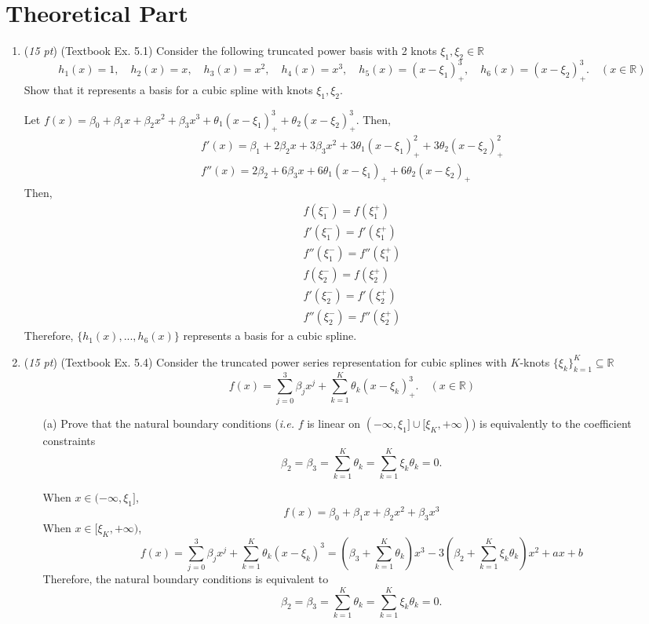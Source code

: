 \documentclass[10pt]{article}
\theoremstyle{definition}
\theoremstyle{remark}
\newcommand{\bbR}{\mathbb{R}}
\begin{document}
\section*{Theoretical Part}
\begin{enumerate}
	\item (\textit{15 pt}) (Textbook Ex. 5.1) Consider the following truncated power basis with 2 knots $ \xi_{1},\xi_{2} \in \bbR $
	\[ h_{1}(x) = 1, \quad h_{2}(x) = x, \quad h_{3}(x) = x^{2}, \quad h_{4}(x) = x^{3}, \quad h_{5}(x) = (x - \xi_{1})_{+}^{3}, \quad h_{6}(x) = (x - \xi_{2})_{+}^{3}. \quad(x \in \bbR) \]
	Show that it represents a basis for a cubic spline with knots $\xi_{1},\xi_{2}$. 
	
	Let $f(x) = \beta_0 + \beta_1 x + \beta_2 x^2 + \beta_3 x^3 + \theta_1 (x-\xi_1)_+^3 + \theta_2 (x-\xi_2)_+^3$. Then,
	\begin{gather*}
	    f'(x) = \beta_1 + 2\beta_2 x + 3\beta_3 x^2 + 3\theta_1 (x-\xi_1)_+^2 + 3\theta_2 (x-\xi_2)_+^2 \\
	    f''(x) = 2\beta_2 + 6\beta_3 x + 6\theta_1 (x-\xi_1)_+ + 6\theta_2 (x-\xi_2)_+
	\end{gather*}
	Then,
	\begin{gather*}
	    f(\xi_1^-) = f(\xi_1^+)  \\
	    f'(\xi_1^-) = f'(\xi_1^+)  \\
	    f''(\xi_1^-) = f''(\xi_1^+)  \\
	    f(\xi_2^-) = f(\xi_2^+)  \\
	    f'(\xi_2^-) = f'(\xi_2^+)  \\
	    f''(\xi_2^-) = f''(\xi_2^+) 
	\end{gather*}
	Therefore, $\{h_1(x), ... ,h_6(x)\}$ represents a basis for a cubic spline.

	\item (\textit{15 pt}) (Textbook Ex. 5.4) Consider the truncated power series representation for cubic splines with $ K $-knots $ \{ \xi_{k} \}_{k=1}^{K} \subseteq \bbR $
	\[ f(x) = \sum_{j=0}^{3}\beta_{j}x^{j} + \sum_{k=1}^{K}\theta_{k}(x - \xi_{k})_{+}^{3}. \quad(x \in \bbR) \]
	\begin{itemize}
		\item [(a)] Prove that the natural boundary conditions (\textit{i.e.} $ f $ is linear on $ (-\infty,\xi_{1}]\cup[\xi_{K},+\infty) $) is equivalently to the coefficient constraints
		\[ \beta_{2} = \beta_{3} = \sum_{k=1}^{K}\theta_{k} = \sum_{k=1}^{K}\xi_{k}\theta_{k} = 0. \]
		
		When $x \in (-\infty,\xi_{1}]$, \[f(x) = \beta_{0} + \beta_{1}x+ \beta_{2}x^{2} + \beta_{3}x^{3} \]
		When $x \in [\xi_{K},+\infty)$, \[f(x) = \sum_{j=0}^{3}\beta_{j}x^{j} + \sum_{k=1}^{K}\theta_{k}(x - \xi_{k})^{3} = \left(\beta_3 + \sum_{k=1}^{K}\theta_k\right)x^3 - 3\left(\beta_2 + \sum_{k=1}^{K}\xi_{k}\theta_{k}\right)x^2 + ax+b\]
		Therefore, the natural boundary conditions is equivalent to
		\[ \beta_{2} = \beta_{3} = \sum_{k=1}^{K}\theta_{k} = \sum_{k=1}^{K}\xi_{k}\theta_{k} = 0. \]
		

\end{itemize}
\end{enumerate}
\end{document}
